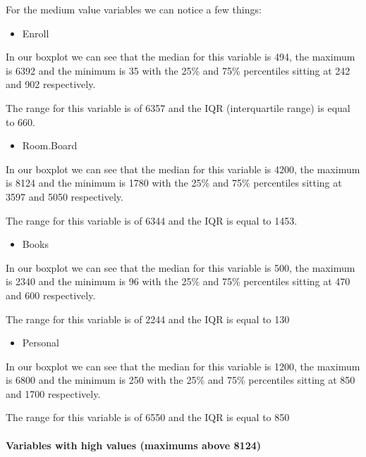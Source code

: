 \documentclass[]{article}
\providecommand{\tightlist}{%
  \setlength{\itemsep}{0pt}\setlength{\parskip}{0pt}}
\let\oldparagraph\paragraph
\renewcommand{\paragraph}[1]{\oldparagraph{#1}\mbox{}}
\begin{document}
For the medium value variables we can notice a few things:

\begin{itemize}
\tightlist
\item
  Enroll
\end{itemize}

In our boxplot we can see that the median for this variable is 494, the
maximum is 6392 and the minimum is 35 with the 25\% and 75\% percentiles
sitting at 242 and 902 respectively.

The range for this variable is of 6357 and the IQR (interquartile range)
is equal to 660.

\begin{itemize}
\tightlist
\item
  Room.Board
\end{itemize}

In our boxplot we can see that the median for this variable is 4200, the
maximum is 8124 and the minimum is 1780 with the 25\% and 75\%
percentiles sitting at 3597 and 5050 respectively.

The range for this variable is of 6344 and the IQR is equal to 1453.

\begin{itemize}
\tightlist
\item
  Books
\end{itemize}

In our boxplot we can see that the median for this variable is 500, the
maximum is 2340 and the minimum is 96 with the 25\% and 75\% percentiles
sitting at 470 and 600 respectively.

The range for this variable is of 2244 and the IQR is equal to 130

\begin{itemize}
\tightlist
\item
  Personal
\end{itemize}

In our boxplot we can see that the median for this variable is 1200, the
maximum is 6800 and the minimum is 250 with the 25\% and 75\%
percentiles sitting at 850 and 1700 respectively.

The range for this variable is of 6550 and the IQR is equal to 850

\hypertarget{variables-with-high-values-maximums-above-8124}{%
\paragraph{Variables with high values (maximums above
8124)}\label{variables-with-high-values-maximums-above-8124}}
\end{document}
